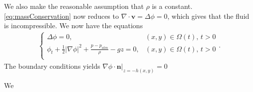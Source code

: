 \documentclass[12pt]{article}
\begin{document}
We also make the reasonable assumption that $\rho$ is a constant. \eqref{eq:massConservation} now reduces to
$\nabla \cdot \bm{v} = \Delta \phi = 0$, which gives that the fluid is incompressible. We now have
the equations
\begin{align}
    \begin{cases}
        \Delta \phi = 0,                                                 &  (x,y) \in \Omega(t), \, t > 0 \\
        \phi_t + \frac{1}{2}|\nabla \phi|^2 + \frac{p-p_{atm}}{\rho} - g z = 0,
                                                                         &  (x,y) \in \Omega(t), \, t > 0 \\
    \end{cases}.
\end{align}
The boundary conditions yields $\nabla \phi \cdot \bm{n}|_{z = -h(x,y)} = 0$

We 
\end{document}
